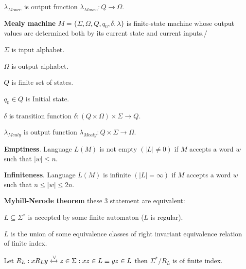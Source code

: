 \documentclass[a4paper,10pt]{article}
\newcommand{\alphabet}[1]{\Sigma{#1}}
\begin{document}
\begin{terms}
\begin{terms}
        \item 
        $\lambda_{Moore}$ is output function $\lambda_{Moore}: Q \rightarrow \Omega$.
    \end{terms}

    \item
    \textbf{Mealy machine} $M = \{\Sigma, \Omega, Q, q_0, \delta, \lambda\}$ is finite-state machine whose output values are determined both by its current state and current inputs./

    \begin{terms}
        \item 
        $\alphabet{}$ is input alphabet.

        \item 
        $\Omega$ is output alphabet.

        \item 
        $Q$ is finite set of states.

        \item 
        $q_0 \in Q$ is Initial state.

        \item 
        $\delta$ is transition function $\delta: (Q \times \Omega) \times \alphabet{} \rightarrow Q$.

        \item 
        $\lambda_{Mealy}$ is output function $\lambda_{Mealy}: Q \times \alphabet{} \rightarrow \Omega$.
    \end{terms}

    \item
    \textbf{Emptiness}. Language $L(M)$ is not empty $(|L| \not= 0)$ if $M$ accepts a word $w$ such that $|w| \leq n$.

    \item
    \textbf{Infiniteness}. Language $L(M)$ is infinite $(|L| = \infty)$ if $M$ accepts a word $w$ such that $n \leq |w| \leq 2n$.

    \item
    \textbf{Myhill-Nerode theorem} these 3 statement are equivalent:
    \begin{terms}
        \item
        $L \subseteq \alphabet{}^*$ is accepted by some finite automaton ($L$ is regular).

        \item 
        $L$ is the union of some equivalence classes of right invariant equivalence relation of finite index.

        \item
        Let $R_L: xR_Ly \xleftrightarrow \forall z \in \alphabet{}: xz \in L \equiv yz \in L$ then $\alphabet{}^*/R_L$ is of finite index.
    \end{terms}
    
\end{terms}
\end{document}

